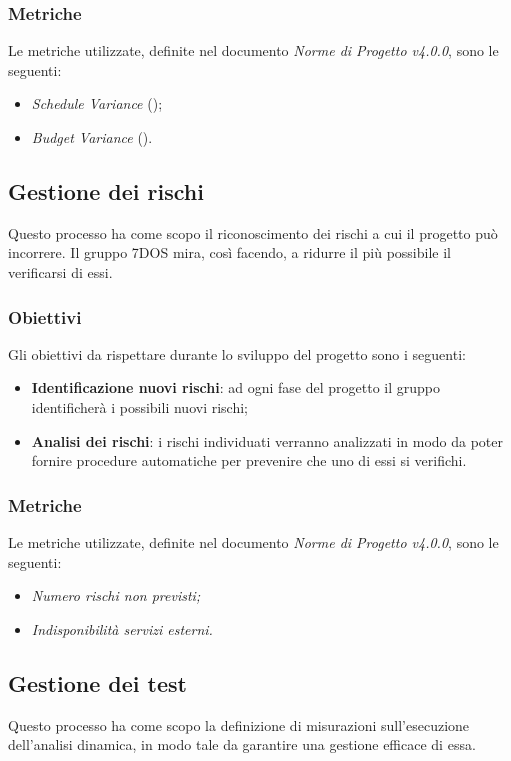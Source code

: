 \subsubsection{Metriche}
Le metriche utilizzate, definite nel documento \emph{Norme di Progetto v4.0.0}, sono le seguenti:
\begin{itemize}
			\item{\emph{Schedule Variance} ();}
			\item{\emph{Budget Variance} ().}
\end{itemize}

\subsection{Gestione dei rischi}
Questo processo ha come scopo il riconoscimento dei rischi a cui il progetto può incorrere. Il gruppo 7DOS mira, così facendo, a ridurre il più possibile il verificarsi di essi.
\subsubsection{Obiettivi} 
Gli obiettivi da rispettare durante lo sviluppo del progetto sono i seguenti:
\begin{itemize}
	\item{\textbf{Identificazione nuovi rischi}: ad ogni fase del progetto il gruppo identificherà i possibili nuovi rischi;}
	\item{\textbf{Analisi dei rischi}: i rischi individuati verranno analizzati in modo da poter fornire procedure automatiche per prevenire che uno di essi si verifichi.}
\end{itemize}
\subsubsection{Metriche}
Le metriche utilizzate, definite nel documento \emph{Norme di Progetto v4.0.0}, sono le seguenti:
\begin{itemize}
	\item\emph{Numero rischi non previsti;}
	\item\emph{Indisponibilità servizi esterni.}
\end{itemize}

\subsection{Gestione dei test}
Questo processo ha come scopo la definizione di misurazioni sull'esecuzione dell'analisi dinamica, in modo tale da garantire una gestione efficace di essa.
